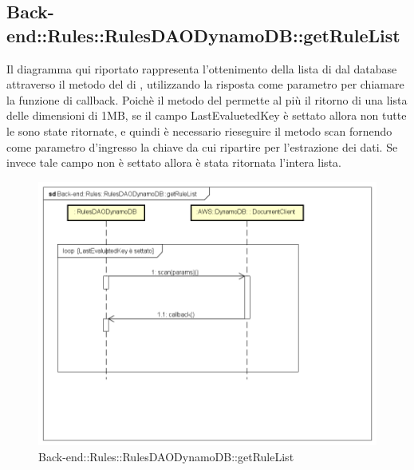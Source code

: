 \subsection{Back-end::Rules::RulesDAODynamoDB::getRuleList}
Il diagramma qui riportato rappresenta l'ottenimento della lista di  dal database attraverso il metodo  del  di , utilizzando la risposta come parametro per chiamare la funzione di callback. Poichè il metodo  del  permette al più il ritorno di una lista delle dimensioni di 1MB, se il campo LastEvaluetedKey è settato allora non tutte le  sono state ritornate, e quindi è necessario rieseguire il metodo scan fornendo come parametro d'ingresso la chiave da cui ripartire per l'estrazione dei dati. Se invece tale campo non è settato allora è stata ritornata l'intera lista.
 \begin{figure}[h] \centering \includegraphics[width=\textwidth,height=\textheight,keepaspectratio]{images/diagrams/back-end/Ufficial_Backend/Back-endRulesRulesDAODynamoDBgetRuleList.png} 	\caption{Back-end::Rules::RulesDAODynamoDB::getRuleList}
\end{figure}
\newpage

